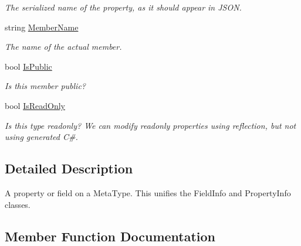 \begin{DoxyCompactItemize}
\begin{DoxyCompactList}\small\item\em The serialized name of the property, as it should appear in J\+S\+ON. \end{DoxyCompactList}\item 
string \hyperlink{class_full_serializer_1_1_internal_1_1fs_meta_property_a264ceb4e5722ffda84edb75da2bcde60}{Member\+Name}
\begin{DoxyCompactList}\small\item\em The name of the actual member. \end{DoxyCompactList}\item 
bool \hyperlink{class_full_serializer_1_1_internal_1_1fs_meta_property_a0a13573323d3be45eef28db6efad3527}{Is\+Public}
\begin{DoxyCompactList}\small\item\em Is this member public? \end{DoxyCompactList}\item 
bool \hyperlink{class_full_serializer_1_1_internal_1_1fs_meta_property_a120091fa074fb12f33c60e3b096f75e4}{Is\+Read\+Only}
\begin{DoxyCompactList}\small\item\em Is this type readonly? We can modify readonly properties using reflection, but not using generated C\#. \end{DoxyCompactList}\end{DoxyCompactItemize}


\subsection{Detailed Description}
A property or field on a Meta\+Type. This unifies the Field\+Info and Property\+Info classes. 



\subsection{Member Function Documentation}
\mbox{\label{class_full_serializer_1_1_internal_1_1fs_meta_property_a6b90255d4c04c1d09e9aa112463637f1}} 
